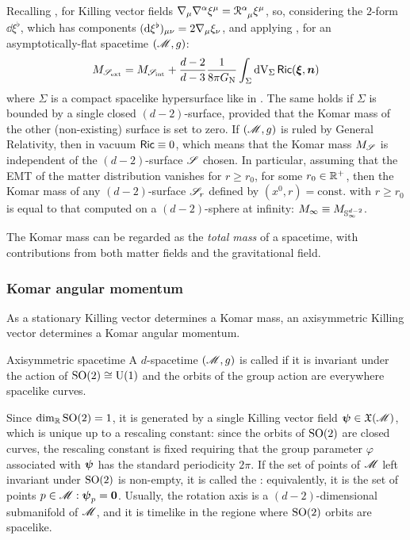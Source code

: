 Recalling , for Killing vector fields $ \na_\mu \na^\alpha \xi^\mu = \tensor{\rr}{^\alpha_\mu} \xi^\mu $, so, considering the $ 2 $-form $ \dd \xi^\flat $, which has components $ (\mathrm{d} \xi^\flat)_{\mu \nu} = 2 \nabla_\mu \xi_\nu $, and applying , for an asymptotically-flat spacetime $ (\mathscr{M} , g) $:
\begin{equation}
  M_{\mathscr{S}_\text{ext}} = M_{\mathscr{S}_\text{int}} + \frac{d-2}{d-3} \frac{1}{8\pi G_\text{N}} \int_\Sigma \mathrm{d} \mathrm{V}_\Sigma \, \textsf{Ric}(\boldsymbol{\xi} , \boldsymbol{n})
  \label{eq:komar-mass-cons}
\end{equation}
where $ \Sigma $ is a compact spacelike hypersurface like in . The same holds if $ \Sigma $ is bounded by a single closed $ (d-2) $-surface, provided that the Komar mass of the other (non-existing) surface is set to zero. If $ (\mathscr{M} , g) $ is ruled by General Relativity, then in vacuum $ \textsf{Ric} \equiv 0 $, which means that the Komar mass $ M_\mathscr{S} $ is independent of the $ (d-2) $-surface $ \mathscr{S} $ chosen. In particular, assuming that the EMT of the matter distribution vanishes for $ r \geq r_0 $, for some $ r_0 \in \mathbb{R}^+ $, then the Komar mass of any $ (d-2) $-surface $ \mathscr{S}_r $ defined by $ (x^0 , r) = \text{const.} $ with $ r \geq r_0 $ is equal to that computed on a $ (d-2) $-sphere at infinity: $ M_\infty \equiv M_{\mathbb{S}^{d-2}_\infty} $.

The Komar mass can be regarded as the \emph{total mass} of a spacetime, with contributions from both matter fields and the gravitational field.


\subsubsection{Komar angular momentum}

As a stationary Killing vector determines a Komar mass, an axisymmetric Killing vector determines a Komar angular momentum.

\begin{definition}{Axisymmetric spacetime}{}
  A $ d $-spacetime $ (\mathscr{M} , g) $ is called  if it is invariant under the action of $ \mathrm{SO}(2) \cong \mathrm{U}(1) $ and the orbits of the group action are everywhere spacelike curves.
\end{definition}

Since $ \dim_{\mathbb{R}} \mathrm{SO}(2) = 1 $, it is generated by a single Killing vector field $ \boldsymbol{\psi} \in \mathfrak{X}(\mathscr{M}) $, which is unique up to a rescaling constant: since the orbits of $ \mathrm{SO}(2) $ are closed curves, the rescaling constant is fixed requiring that the group parameter $ \varphi $ associated with $ \boldsymbol{\psi} $ has the standard periodicity $ 2\pi $. If the set of points of $ \mathscr{M} $ left invariant under $ \mathrm{SO}(2) $ is non-empty, it is called the : equivalently, it is the set of points $ p \in \mathscr{M} : \boldsymbol{\psi}_p = \boldsymbol{0} $. Usually, the rotation axis is a $ (d-2) $-dimensional submanifold of $ \mathscr{M} $, and it is timelike in the regione where $ \mathrm{SO}(2) $ orbits are spacelike.

